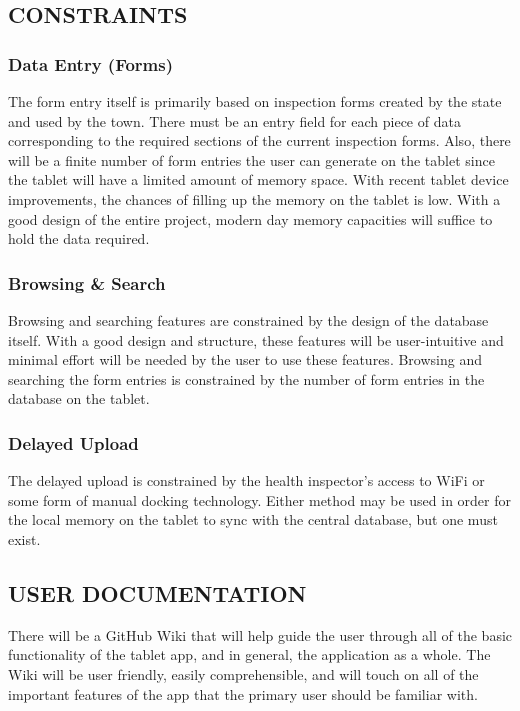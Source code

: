 \documentclass[twoside,letterpaper]{article}
\begin{document}
\subsection[CONSTRAINTS]{\rmfamily\bfseries\color{black}
CONSTRAINTS}
\subsubsection{Data Entry (Forms)}
{\color{black}
The form entry itself is primarily based on inspection forms created by the state and used by the town. There must be an entry field for each piece of data corresponding to the required sections of the current inspection forms. Also, there will be a finite number of form entries the user can generate on the tablet since the tablet will have a limited amount of memory space. With recent tablet device improvements, the chances of filling up the memory on the tablet is low. With a good design of the entire project, modern day memory capacities will suffice to hold the data required.}

\subsubsection{Browsing \& Search}
{\color{black}
Browsing and searching features are constrained by the design of the database itself. With a good design and structure, these features will be user-intuitive and minimal effort will be needed by the user to use these features. Browsing and searching the form entries is constrained by the number of form entries in the database on the tablet.}

\subsubsection{Delayed Upload}
{\color{black}
The delayed upload is constrained by the health inspector's access to WiFi or some form of manual docking technology. Either method may be used in order for the local memory on the tablet to sync with the central database, but one must exist.}

\subsection[USER DOCUMENTATION]{\rmfamily\bfseries\color{black}
USER DOCUMENTATION}
{\rmfamily\color{black}
There will be a GitHub Wiki that will help guide the user through all of the basic functionality of the tablet app, and in general, the application as a whole. The Wiki will be user friendly, easily comprehensible, and will touch on all of the important features of the app that the primary user should be familiar with.}
\end{document}
